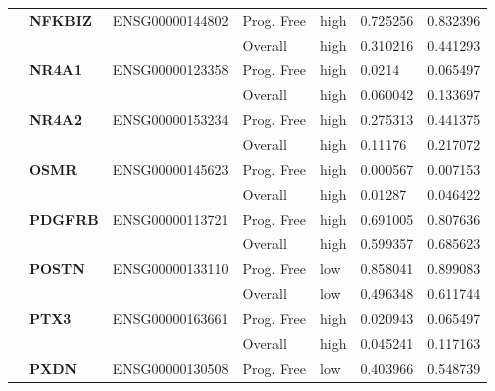 \begin{spacing}{1}
{\begin{longtable}{|>{\bfseries}p{2cm}|>{\bfseries}p{1.9cm}|p{2.8cm}|p{2cm}|p{2cm}|p{1.5cm}|p{1.5cm}|}
            \hhline{~======}
             & NFKBIZ   & ENSG00000144802 & Prog. Free & high & 0.725256 & 0.832396                \\
            \hhline{~~~----}
             &          &                 & Overall    & high & 0.310216 & 0.441293                \\
            \hhline{~======}
             & NR4A1    & ENSG00000123358 & Prog. Free & high & 0.0214   & 0.065497                \\
            \hhline{~~~----}
             &          &                 & Overall    & high & 0.060042 & 0.133697                \\
            \hhline{~======}
             & NR4A2    & ENSG00000153234 & Prog. Free & high & 0.275313 & 0.441375                \\
            \hhline{~~~----}
             &          &                 & Overall    & high & 0.11176  & 0.217072                \\
            \hhline{~======}
             & OSMR     & ENSG00000145623 & Prog. Free & high & 0.000567 & 0.007153                \\
            \hhline{~~~----}
             &          &                 & Overall    & high & 0.01287  & 0.046422                \\
            \hhline{~======}
             & PDGFRB   & ENSG00000113721 & Prog. Free & high & 0.691005 & 0.807636                \\
            \hhline{~~~----}
             &          &                 & Overall    & high & 0.599357 & 0.685623                \\
            \hhline{~======}
             & POSTN    & ENSG00000133110 & Prog. Free & low  & 0.858041 & 0.899083                \\
            \hhline{~~~----}
             &          &                 & Overall    & low  & 0.496348 & 0.611744                \\
            \hhline{~======}
             & PTX3     & ENSG00000163661 & Prog. Free & high & 0.020943 & 0.065497                \\
            \hhline{~~~----}
             &          &                 & Overall    & high & 0.045241 & 0.117163                \\
            \hhline{~======}
             & PXDN     & ENSG00000130508 & Prog. Free & low  & 0.403966 & 0.548739                \\

\end{longtable}}
\end{spacing}
